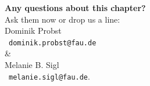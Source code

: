 \begin{frame}[c]
  \begin{center}
    {\bf Any questions about this chapter?}\\[0.5cm]
    Ask them now or drop us a line: \\\bigskip
    Dominik Probst\\
    \faPaperPlane[regular] \ \texttt{dominik.probst@fau.de}\\\smallskip
    \&\\\smallskip
    Melanie B. Sigl\\
    \faPaperPlane[regular] \ \texttt{melanie.sigl@fau.de}.
  \end{center}
\end{frame}